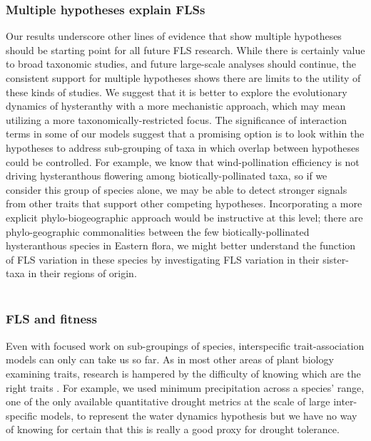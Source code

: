 \documentclass{article}
\begin{document}
{\subsubsection*{Multiple hypotheses explain FLSs}

\noindent Our results underscore other lines of evidence that show multiple hypotheses should be starting point for all future FLS research. While there is certainly value to broad taxonomic studies, and future large-scale analyses should continue, the consistent support for multiple hypotheses shows there are limits to the utility of these kinds of studies. We suggest that it is better to explore the evolutionary dynamics of hysteranthy with a more mechanistic approach, which may mean utilizing a more taxonomically-restricted focus. The significance of interaction terms in some of our models suggest that a promising option is to look within the hypotheses to address sub-grouping of taxa in which overlap between hypotheses could be controlled. For example, we know that wind-pollination efficiency is not driving hysteranthous flowering among biotically-pollinated taxa, so if we consider this group of species alone, we may be able to detect stronger signals from other traits that support other competing hypotheses. Incorporating a more explicit phylo-biogeographic approach would be instructive at this level; there are phylo-geographic commonalities between the few biotically-pollinated hysteranthous species in Eastern flora, we might better understand the function of FLS variation in these species by investigating FLS variation in their sister-taxa in their regions of origin.\\ 

\subsubsection*{FLS and fitness}
Even with focused work on sub-groupings of species, interspecific trait-association models can only can take us so far. As in most other areas of plant biology examining traits, research is hampered by the difficulty of knowing which are the right traits \citep{}. For example, we used minimum precipitation across a species' range, one of the only available quantitative drought metrics at the scale of large inter-specific models, to represent the water dynamics hypothesis but we have no way of knowing for certain that this is really a good proxy for drought tolerance. \\

}
\end{document}
